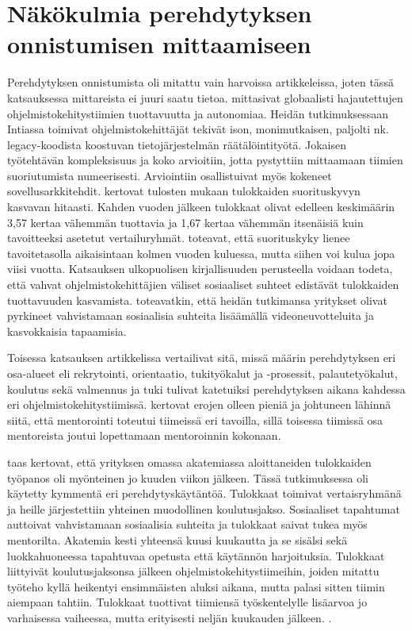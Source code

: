 \documentclass[utf8]{gradu3}
\begin{document}
\section{Näkökulmia perehdytyksen onnistumisen mittaamiseen}
\label{luku-näkökulmia-perehdytyksen-onnistustumisen-mittaamiseen}

Perehdytyksen onnistumista oli mitattu vain harvoissa artikkeleissa, joten tässä katsauksessa mittareista ei juuri saatu tietoa. \textcite{britto-ym-2020} mittasivat globaalisti hajautettujen ohjelmistokehitystiimien tuottavuutta ja autonomiaa. Heidän tutkimuksessaan Intiassa toimivat ohjelmistokehittäjät tekivät ison, monimutkaisen, paljolti nk. legacy-koodista koostuvan tietojärjestelmän räätälöintityötä. Jokaisen työtehtävän kompleksisuus ja koko arvioitiin, jotta pystyttiin mittaamaan tiimien suoriutumista numeerisesti. Arviointiin osallistuivat myös kokeneet sovellusarkkitehdit. \textcite{britto-ym-2020} kertovat tulosten mukaan tulokkaiden suorituskyvyn kasvavan hitaasti. Kahden vuoden jälkeen tulokkaat olivat edelleen keskimäärin 3,57 kertaa vähemmän tuottavia ja 1,67 kertaa vähemmän itsenäisiä kuin tavoitteeksi asetetut vertailuryhmät. \textcite{britto-ym-2020} toteavat, että suorituskyky lienee tavoitetasolla aikaisintaan kolmen vuoden kuluessa, mutta siihen voi kulua jopa viisi vuotta. Katsauksen ulkopuolisen kirjallisuuden perusteella \parencite{casalnuovo-ym-2015} voidaan todeta, että vahvat ohjelmistokehittäjien väliset sosiaaliset suhteet edistävät tulokkaiden tuottavuuden kasvamista. \textcite{britto-ym-2020} toteavatkin, että heidän tutkimansa yritykset olivat pyrkineet vahvistamaan sosiaalisia suhteita lisäämällä videoneuvotteluita ja kasvokkaisia tapaamisia. 

Toisessa katsauksen artikkelissa \textcite{moe-ym-2020} vertailivat sitä, missä määrin perehdytyksen eri osa-alueet eli rekrytointi, orientaatio, tukityökalut ja -prosessit, palautetyökalut, koulutus sekä valmennus ja tuki \parencite{bauer-2010} tulivat katetuiksi perehdytyksen aikana kahdessa eri ohjelmistokehitystiimissä. \textcite{moe-ym-2020} kertovat erojen olleen pieniä ja johtuneen lähinnä siitä, että mentorointi toteutui tiimeissä eri tavoilla, sillä toisessa tiimissä osa mentoreista joutui lopettamaan mentoroinnin kokonaan.

\textcite{shannon-pool-2016} taas kertovat, että yrityksen omassa akatemiassa aloittaneiden tulokkaiden työpanos oli myönteinen jo kuuden viikon jälkeen. Tässä tutkimuksessa oli käytetty kymmentä eri perehdytyskäytäntöä. Tulokkaat toimivat vertaisryhmänä ja heille järjestettiin yhteinen muodollinen koulutusjakso. Sosiaaliset tapahtumat auttoivat vahvistamaan sosiaalisia suhteita ja tulokkaat saivat tukea myös mentorilta. Akatemia kesti yhteensä kuusi kuukautta ja se sisälsi sekä luokkahuoneessa tapahtuvaa opetusta että käytännön harjoituksia. Tulokkaat liittyivät koulutusjaksonsa jälkeen ohjelmistokehitystiimeihin, joiden mitattu työteho kyllä heikentyi ensimmäisten aluksi aikana, mutta palasi sitten tiimin aiempaan tahtiin. Tulokkaat tuottivat tiimiensä työskentelylle lisäarvoa jo varhaisessa vaiheessa, mutta erityisesti neljän kuukauden jälkeen. \parencite{shannon-pool-2016}.
\end{document}
